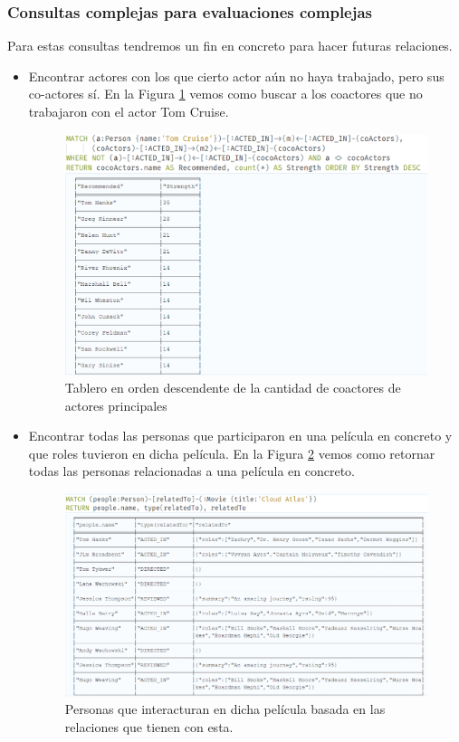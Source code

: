 \subsubsection{Consultas complejas para evaluaciones complejas}
Para estas consultas tendremos un fin en concreto para hacer futuras relaciones.
\begin{itemize}
    \item Encontrar actores con los que cierto actor aún no haya trabajado, pero sus co-actores sí.
    En la Figura \ref{fig:coac} vemos como buscar a los coactores que no trabajaron con el actor Tom Cruise.
    \begin{figure}[H]
    \centering
    \includegraphics[scale=0.6]{Graficos/coactors.png}
    \caption{Tablero en orden descendente de la cantidad de coactores de actores principales}
    \label{fig:coac}
    \end{figure}
    \item Encontrar todas las personas que participaron en una película en concreto y que roles tuvieron en dicha película.
    En la Figura \ref{fig:inter} vemos como retornar todas las personas relacionadas a una película en concreto.
    \begin{figure}[H]
    \centering
    \includegraphics[scale=0.5]{Graficos/interact.png}
    \caption{Personas que interacturan en dicha película basada en las relaciones que tienen con esta.}
    \label{fig:inter}
    \end{figure}
\end{itemize}
